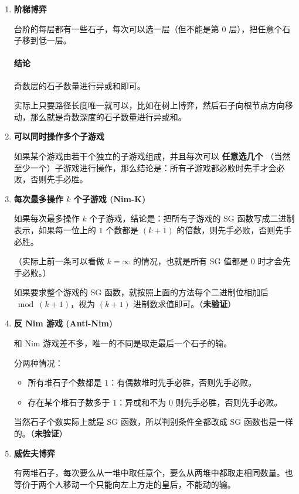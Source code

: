 \begin{enumerate}

\item \textbf{阶梯博弈}

台阶的每层都有一些石子，每次可以选一层（但不能是第 $0$ 层），把任意个石子移到低一层。

\paragraph{结论} 奇数层的石子数量进行异或和即可。

实际上只要路径长度唯一就可以，比如在树上博弈，然后石子向根节点方向移动，那么就是奇数深度的石子数量进行异或和。

\item \textbf{可以同时操作多个子游戏}

如果某个游戏由若干个独立的子游戏组成，并且每次可以 \textbf{任意选几个} （当然至少一个）子游戏进行操作，那么结论是：所有子游戏都必败时先手才会必败，否则先手必胜。

\item \textbf{每次最多操作 $k$ 个子游戏 (Nim-K)}

如果每次最多操作 $k$ 个子游戏，结论是：把所有子游戏的 SG 函数写成二进制表示，如果每一位上的 $1$ 个数都是 $(k+1)$ 的倍数，则先手必败，否则先手必胜。

（实际上前一条可以看做 $k = \infty$ 的情况，也就是所有 SG 值都是 $0$ 时才会先手必败。）

如果要求整个游戏的 SG 函数，就按照上面的方法每个二进制位相加后 $\bmod (k+1)$，视为 $(k+1)$ 进制数求值即可。（\textbf{未验证}）

\item \textbf{反 Nim 游戏 (Anti-Nim)}

和 Nim 游戏差不多，唯一的不同是取走最后一个石子的输。

分两种情况：

\begin{itemize}
	\item 所有堆石子个数都是 $1$：有偶数堆时先手必胜，否则先手必败。
	\item 存在某个堆石子数多于 $1$：异或和不为 $0$ 则先手必胜，否则先手必败。
\end{itemize}

当然石子个数实际上就是 SG 函数，所以判别条件全都改成 SG 函数也是一样的。（\textbf{未验证}）

\item \textbf{威佐夫博弈}

有两堆石子，每次要么从一堆中取任意个，要么从两堆中都取走相同数量。也等价于两个人移动一个只能向左上方走的皇后，不能动的输。


\end{enumerate}
